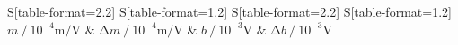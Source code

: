 \begin{table}
    \centering
    \caption{Fitparameter: Steigung $m$ und y-Achsenabschnitt $b$.}
    \label{tab:c}
    \begin{tabular}{
	S[table-format=2.2]
	S[table-format=1.2]
	S[table-format=2.2]
	S[table-format=1.2]
	}
	\toprule
	{$m \:/\: 10^{-4}\si{\metre\per\volt}$}		& {$\increment{m} \:/\: 10^{-4}\si{\metre\per\volt}$}		& 
	{$b \:/\: 10^{-3}\si{\volt}$}		& {$\increment{b} \:/\: 10^{-3}\si{\volt}$}		\\ 
	\midrule
    
    \bottomrule
    \end{tabular}
    \end{table}
